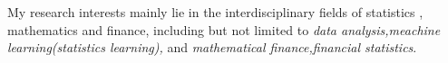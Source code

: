 
My research interests mainly lie in the interdisciplinary fields of statistics , mathematics and finance,
including but not limited to 
\textit{data analysis,meachine learning(statistics learning),}
and
\textit{mathematical finance,financial statistics}.

\endinput